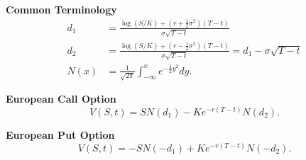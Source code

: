 \documentclass[11pt]{article}
\begin{document}
\newpage

\textbf{Common Terminology}
\begin{align}
    d_1 &= \frac{\log (S/K) + (r + \frac{1}{2} \sigma^2)(T-t)}{\sigma \sqrt{T-t}} \\
    d_2 &= \frac{\log (S/K) + (r - \frac{1}{2} \sigma^2)(T-t)}{\sigma \sqrt{T-t}} = d_1 - \sigma \sqrt{T-t} \\
    N(x) &= \frac{1}{\sqrt{2 \pi}} \int_{-\infty}^{x} e^{-\frac{1}{2}y^2} dy.
\end{align}

\textbf{European Call Option}
\begin{equation}
    V(S,t) = SN(d_1) - Ke^{-r(T-t)}N(d_2).
\end{equation}

\textbf{European Put Option}
\begin{equation}
    V(S,t) = -SN(-d_1) + Ke^{-r(T-t)}N(-d_2).
\end{equation}
\end{document}
